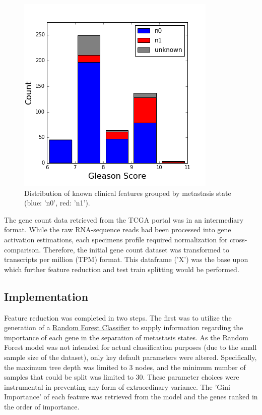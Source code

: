 \documentclass[final]{article}
\begin{document}
\begin{figure}
  \centering
  \includegraphics[scale=0.5]{GleasonHist2}
  \caption{Distribution of known clinical features grouped by metastasis state (blue: 'n0', red: 'n1').\label{fig:postGSHist}}
\end{figure}

The gene count data retrieved from the TCGA portal was in an intermediary
format.  While the raw RNA-sequence reads had been processed into gene
activation estimations, each specimens profile required normalization for
cross-comparison.   Therefore, the initial gene count dataset was transformed to
transcripts per million (TPM) format.  This dataframe ('X') was the base upon
which further feature reduction and test train splitting would be performed.

\subsection{Implementation}

Feature reduction was completed in two steps.  The first was to utilize the
generation of a \href{http://scikit-learn.org/stable/modules/generated/sklearn.ensemble.RandomForestClassifier.html#sklearn.ensemble.RandomForestClassifier}{Random Forest Classifier} to supply information regarding the
importance of each gene in the separation of metastasis states.  As the Random
Forest model was not intended for actual classification purposes (due to the
small sample size of the dataset), only key default parameters were altered.
Specifically, the maximum tree depth was limited to 3 nodes, and the minimum
number of samples that could be split was limited to 30.  These parameter choices
were instrumental in preventing any form of extraordinary variance.  The 'Gini
Importance' of each feature was retrieved from the model and the genes ranked
in the order of importance.
\end{document}
